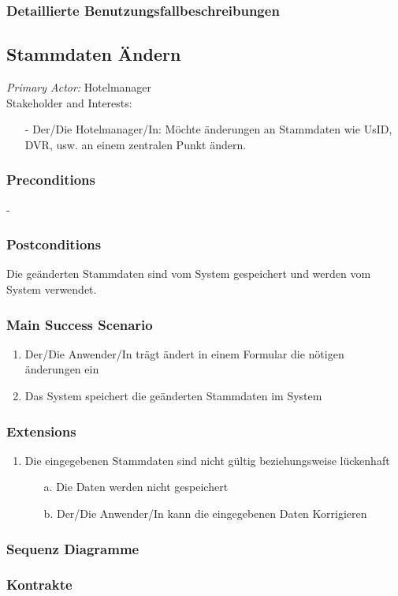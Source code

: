 \documentclass[./detailed_overview_usecases.tex]{subfiles}
\begin{document}
    \subsubsection{Detaillierte Benutzungsfallbeschreibungen}
    \subsection{Stammdaten Ändern}
    \textit{Primary Actor:}
    Hotelmanager
    \\
    Stakeholder and Interests:
    \begin{itemize}
        \item[-] Der/Die Hotelmanager/In: Möchte änderungen an Stammdaten wie UsID, DVR, usw. an  einem zentralen Punkt ändern.
    \end{itemize}

    \subsubsection*{Preconditions}
    -
    \subsubsection*{Postconditions}
    Die geänderten Stammdaten sind vom System gespeichert und werden vom System verwendet.

    \subsubsection*{Main Success Scenario}
    \begin{enumerate}
        \item Der/Die Anwender/In trägt ändert in einem Formular die nötigen änderungen ein
        \item Das System speichert die geänderten Stammdaten im System
    \end{enumerate}

    \subsubsection*{Extensions}
    \begin{enumerate}
        \item Die eingegebenen Stammdaten sind nicht gültig beziehungsweise lückenhaft
        \begin{itemize}
            \item[a.] Die Daten werden nicht gespeichert
            \item[b.] Der/Die Anwender/In kann die eingegebenen Daten Korrigieren
        \end{itemize}
    \end{enumerate}

    \subsubsection{Sequenz Diagramme}
    \subsubsection{Kontrakte}
\end{document}
